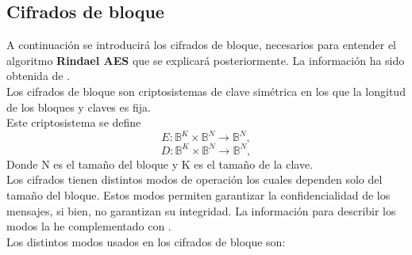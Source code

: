 \subsection{Cifrados de bloque}
A continuación se introducirá los cifrados de bloque, necesarios para entender el algoritmo \textbf{Rindael AES} que se explicará posteriormente. La información ha sido obtenida de \cite{apuntesCriptografia}.\\
Los cifrados de bloque son criptosistemas de clave simétrica en los que la longitud de los bloques y claves es fija.\\
Este criptosistema se define
$$
	E:\mathbb{B}^K\times\mathbb{B}^N\rightarrow \mathbb{B}^N,
$$
$$
	D:\mathbb{B}^K\times\mathbb{B}^N\rightarrow \mathbb{B}^N,
$$
Donde N es el tamaño del bloque y K es el tamaño de la clave.\\
Los cifrados tienen distintos modos de operación los cuales dependen solo del tamaño del bloque. Estos modos permiten garantizar la confidencialidad de los mensajes, si bien, no garantizan su integridad. La información para describir los modos la he complementado con \cite{bloquenuevo}.\\ 
Los distintos modos usados en los cifrados de bloque son:\\
